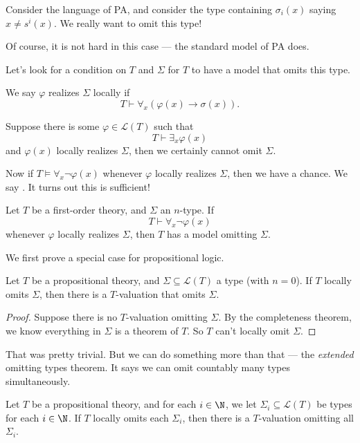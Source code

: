 \documentclass[a4paper]{article}
\begin{document}
\begin{eg}
  Consider the language of PA, and consider the type containing $\sigma_i(x)$ saying $x \not= s^i(x)$. We really want to omit this type!

  Of course, it is not hard in this case --- the standard model of PA does.
\end{eg}

Let's look for a condition on $T$ and $\Sigma$ for $T$ to have a model that omits this type.

\begin{defi}
  We say $\varphi$ realizes $\Sigma$ locally if
  \[
    T \vdash \forall_x(\varphi(x) \to \sigma(x)).
  \]
\end{defi}
Suppose there is some $\varphi \in \mathcal{L}(T)$ such that
\[
  T \vdash \exists_x \varphi(x)
\]
and $\varphi(x)$ locally realizes $\Sigma$, then we certainly cannot omit $\Sigma$.

Now if $T \vDash \forall_x \neg \varphi(x)$ whenever $\varphi$ locally realizes $\Sigma$, then we have a chance. We say . It turns out this is sufficient!

\begin{thm}
  Let $T$ be a first-order theory, and $\Sigma$ an $n$-type. If
  \[
    T \vdash \forall_x \neg \varphi(x)
  \]
  whenever $\varphi$ locally realizes $\Sigma$, then $T$ has a model omitting $\Sigma$.
\end{thm}

We first prove a special case for propositional logic.
\begin{thm}
  Let $T$ be a propositional theory, and $\Sigma \subseteq \mathcal{L}(T)$ a type (with $n = 0$). If $T$ locally omits $\Sigma$, then there is a $T$-valuation that omits $\Sigma$.
\end{thm}

\begin{proof}
  Suppose there is no $T$-valuation omitting $\Sigma$. By the completeness theorem, we know everything in $\Sigma$ is a theorem of $T$. So $T$ can't locally omit $\Sigma$.
\end{proof}
That was pretty trivial. But we can do something more than that --- the \emph{extended} omitting types theorem. It says we can omit countably many types simultaneously.

%
\begin{thm}
  Let $T$ be a propositional theory, and for each $i \in \N$, we let $\Sigma_i \subseteq \mathcal{L}(T)$ be types for each $i \in \N$. If $T$ locally omits each $\Sigma_i$, then there is a $T$-valuation omitting all $\Sigma_i$.
\end{thm}
\end{document}
